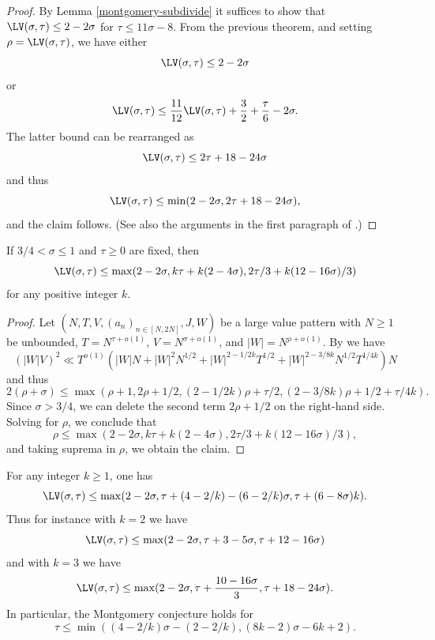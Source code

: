 \begin{proof}  By Lemma \ref{montgomery-subdivide} it suffices to show that $\LV(\sigma,\tau) \leq 2-2\sigma$ for $\tau \leq 11\sigma-8$.  From the previous theorem, and setting $\rho = \LV(\sigma,\tau)$, we have either
$$ \LV(\sigma,\tau) \leq 2-2\sigma$$
or
$$ \LV(\sigma,\tau) \leq \frac{11}{12}\LV(\sigma,\tau) + \frac{3}{2} + \frac{\tau}{6} - 2\sigma.$$
The latter bound can be rearranged as
$$ \LV(\sigma,\tau) \leq 2\tau + 18 - 24\sigma$$
and thus
$$ \LV(\sigma,\tau) \leq \min( 2-2\sigma, 2\tau + 18 - 24\sigma),$$
and the claim follows.  (See also the arguments in the first paragraph of \cite[p. 226]{heathbrown_zero_1979}.)
\end{proof}


\begin{lemma}\label{hb-lvt-2} If $3/4 < \sigma \leq 1$ and $\tau \geq 0$ are fixed, then
    $$ \LV(\sigma,\tau) \leq \max( 2-2\sigma, k\tau + k(2-4\sigma), 2\tau/3 + k(12-16\sigma)/3 )$$
    for any positive integer $k$.
    \end{lemma}

\begin{proof} Let $(N,T,V,(a_n)_{n \in [N,2N]},J,W)$ be a large value pattern with $N \geq 1$ be unbounded, $T = N^{\tau + o(1)}$,  $V = N^{\sigma + o(1)}$, and $|W| = N^{\rho+o(1)}$. By \cite[Lemma~6]{heathbrown_large_1979} we have
    $$ (|W| V)^2 \ll T^{o(1)}( |W|N + |W|^2 N^{1/2} + |W|^{2-1/2k} T^{1/2} + |W|^{2-3/8k} N^{1/2} T^{1/4k}) N$$
and thus
$$ 2(\rho + \sigma) \leq \max( \rho+1, 2\rho+1/2, (2-1/2k)\rho + \tau/2, (2-3/8k)\rho + 1/2 + \tau/4k).$$
Since $\sigma > 3/4$, we can delete the second term $2\rho+1/2$ on the right-hand side. Solving for $\rho$, we conclude that
$$ \rho \leq \max( 2-2\sigma, k\tau + k(2-4\sigma), 2\tau/3 + k(12-16\sigma)/3 ),$$
and taking suprema in $\rho$, we obtain the claim.
\end{proof}

\begin{theorem}\label{jutila-lvt}  For any integer $k \geq 1$, one has
$$ \LV(\sigma,\tau) \leq \max(2-2\sigma, \tau + (4-2/k) - (6-2/k)\sigma, \tau + (6-8\sigma)k).$$
Thus for instance with $k=2$ we have
$$ \LV(\sigma,\tau) \leq \max(2-2\sigma, \tau + 3 - 5\sigma, \tau + 12-16\sigma)$$
and with $k=3$ we have
$$ \LV(\sigma,\tau) \leq \max(2-2\sigma, \tau + \frac{10-16\sigma}{3}, \tau + 18-24\sigma).$$
In particular, the Montgomery conjecture holds for
$$ \tau \leq \min( (4-2/k)\sigma - (2-2/k), (8k-2)\sigma - 6k + 2).$$
\end{theorem}

